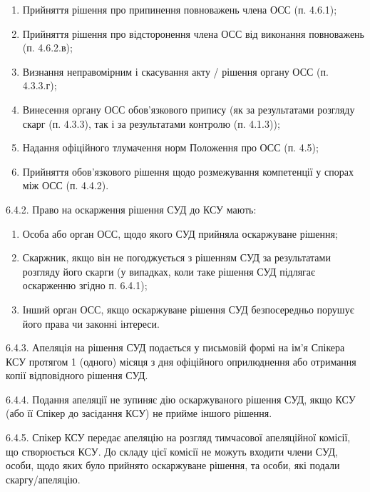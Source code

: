         \begin{enumerate}[label=\alph*)]
            \item Прийняття рішення про припинення повноважень члена ОСС (п. 4.6.1);

            \item Прийняття рішення про відсторонення члена ОСС від виконання повноважень (п. 4.6.2.в);

            \item Визнання неправомірним і скасування акту / рішення органу ОСС (п. 4.3.3.г);

            \item Винесення органу ОСС обов'язкового припису (як за результатами розгляду скарг (п. 4.3.3), так і за результатами контролю (п. 4.1.3));

            \item Надання офіційного тлумачення норм Положення про ОСС (п. 4.5);

            \item Прийняття обов'язкового рішення щодо розмежування компетенції у спорах між ОСС (п. 4.4.2).

        \end{enumerate}

    6.4.2. Право на оскарження рішення СУД до КСУ мають:

        \begin{enumerate}[label=\alph*)]
            \item Особа або орган ОСС, щодо якого СУД прийняла оскаржуване рішення;
            \item Скаржник, якщо він не погоджується з рішенням СУД за результатами розгляду його скарги (у випадках, коли таке рішення СУД підлягає оскарженню згідно п. 6.4.1);

            \item Інший орган ОСС, якщо оскаржуване рішення СУД безпосередньо порушує його права чи законні інтереси.
        \end{enumerate}

    6.4.3. Апеляція на рішення СУД подається у письмовій формі на ім'я Спікера КСУ протягом 1 (одного) місяця з дня офіційного оприлюднення або отримання копії відповідного рішення СУД.

    6.4.4. Подання апеляції не зупиняє дію оскаржуваного рішення СУД, якщо КСУ (або її Спікер до засідання КСУ) не прийме іншого рішення.

    6.4.5. Спікер КСУ передає апеляцію на розгляд тимчасової апеляційної комісії, що створюється КСУ. До складу цієї комісії не можуть входити члени СУД, особи, щодо яких було прийнято оскаржуване рішення, та особи, які подали скаргу/апеляцію.

